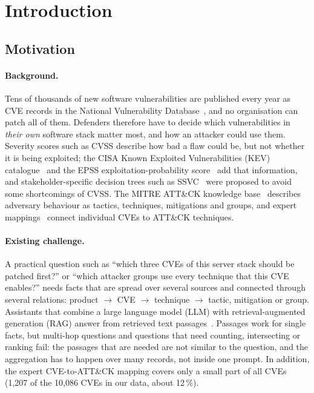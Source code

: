 \documentclass[12pt, a4paper]{article}
\newcommand{\ATTCK}{ATT\&CK}
\begin{document}
\section{Introduction}
\subsection{Motivation}
\paragraph{Background.} Tens of thousands of new software vulnerabilities are published every year as CVE records in the National Vulnerability Database~\cite{nvd}, and no organisation can patch all of them. Defenders therefore have to decide which vulnerabilities in \emph{their own} software stack matter most, and how an attacker could use them. Severity scores such as CVSS describe how bad a flaw could be, but not whether it is being exploited; the CISA Known Exploited Vulnerabilities (KEV) catalogue~\cite{kev} and the EPSS exploitation-probability score~\cite{jacobs2021,jacobs2023} add that information, and stakeholder-specific decision trees such as SSVC~\cite{spring2019} were proposed to avoid some shortcomings of CVSS. The MITRE \ATTCK{} knowledge base~\cite{strom2018} describes adversary behaviour as tactics, techniques, mitigations and groups, and expert mappings~\cite{ctid} connect individual CVEs to \ATTCK{} techniques.

\paragraph{Existing challenge.} A practical question such as ``which three CVEs of this server stack should be patched first?'' or ``which attacker groups use every technique that this CVE enables?'' needs facts that are spread over several sources and connected through several relations: product $\rightarrow$ CVE $\rightarrow$ technique $\rightarrow$ tactic, mitigation or group. Assistants that combine a large language model (LLM) with retrieval-augmented generation (RAG) answer from retrieved text passages~\cite{lewis2020}. Passages work for single facts, but multi-hop questions and questions that need counting, intersecting or ranking fail: the passages that are needed are not similar to the question, and the aggregation has to happen over many records, not inside one prompt. In addition, the expert CVE-to-\ATTCK{} mapping covers only a small part of all CVEs (1,207 of the 10,086 CVEs in our data, about 12\,\%).
\end{document}
